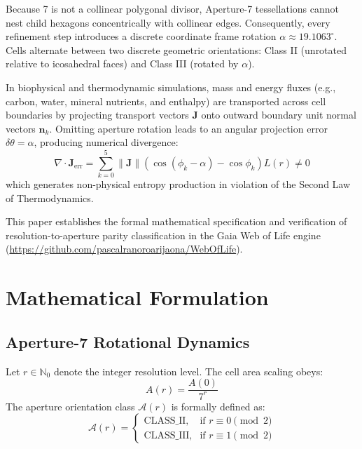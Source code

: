 \documentclass[10pt,journal,compsoc]{IEEEtran}
\begin{document}
Because 7 is not a collinear polygonal divisor, Aperture-7 tessellations cannot nest child hexagons concentrically with collinear edges. Consequently, every refinement step introduces a discrete coordinate frame rotation $\alpha \approx 19.1063^\circ$. Cells alternate between two discrete geometric orientations: Class II (unrotated relative to icosahedral faces) and Class III (rotated by $\alpha$).

In biophysical and thermodynamic simulations, mass and energy fluxes (e.g., carbon, water, mineral nutrients, and enthalpy) are transported across cell boundaries by projecting transport vectors $\mathbf{J}$ onto outward boundary unit normal vectors $\mathbf{n}_k$. Omitting aperture rotation leads to an angular projection error $\delta\theta = \alpha$, producing numerical divergence:
\begin{equation}
\nabla \cdot \mathbf{J}_{\text{err}} = \sum_{k=0}^{5} \|\mathbf{J}\| \left( \cos(\phi_k - \alpha) - \cos\phi_k \right) L(r) \neq 0
\end{equation}
which generates non-physical entropy production in violation of the Second Law of Thermodynamics.

This paper establishes the formal mathematical specification and verification of resolution-to-aperture parity classification in the Gaia Web of Life engine (\url{https://github.com/pascalranoroarijaona/WebOfLife}).

\section{Mathematical Formulation}

\subsection{Aperture-7 Rotational Dynamics}
Let $r \in \mathbb{N}_0$ denote the integer resolution level. The cell area scaling obeys:
\begin{equation}
A(r) = \frac{A(0)}{7^r}
\end{equation}
The aperture orientation class $\mathcal{A}(r)$ is formally defined as:
\begin{equation}
\mathcal{A}(r) = \begin{cases}
\text{CLASS\_II}, & \text{if } r \equiv 0 \pmod 2 \\
\text{CLASS\_III}, & \text{if } r \equiv 1 \pmod 2
\end{cases}
\end{equation}
\end{document}
